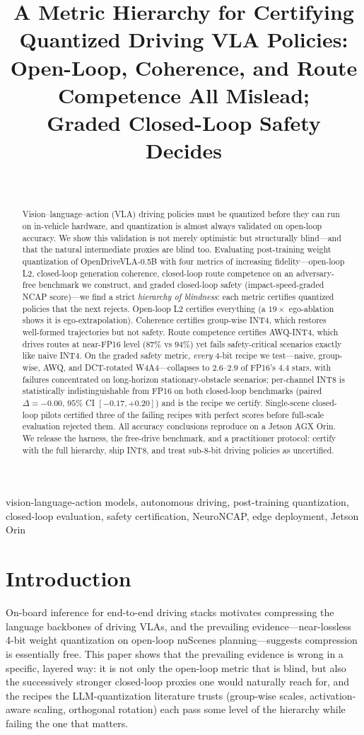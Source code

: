 \documentclass[conference]{IEEEtran}
\title{\textbf{A Metric Hierarchy for Certifying Quantized Driving VLA Policies:\\
Open-Loop, Coherence, and Route Competence All Mislead;\\
Graded Closed-Loop Safety Decides}}
\author{
\IEEEauthorblockN{Justin Williams$^{1}$, Kishor Datta Gupta$^{2}$, Roy George$^{3}$, and Mrinmoy Sarkar$^{4}$
}\\
\IEEEauthorblockA{Department of Cyber-Physical Systems, Clark Atlanta University, Atlanta, GA, USA\\
$^{1}$\textit{justin.williams1@students.cau.edu},
$^{2}$\textit{kgupta@cau.edu},
$^{3}$\textit{rgeorge@cau.edu}}
\IEEEauthorblockA{Siemens Corporation, Princeton, NJ, USA\\
$^{4}$\textit{mrinmoy.sarkar@siemens.com}}
}
\begin{document}
\maketitle

\begin{abstract}
Vision--language--action (VLA) driving policies must be quantized before they can run on
in-vehicle hardware, and quantization is almost always validated on open-loop accuracy. We
show this validation is not merely optimistic but structurally blind---and that the natural
intermediate proxies are blind too. Evaluating post-training weight quantization of
OpenDriveVLA-0.5B with four metrics of increasing fidelity---open-loop L2, closed-loop
generation coherence, closed-loop route competence on an adversary-free benchmark we
construct, and graded closed-loop safety (impact-speed-graded NCAP score)---we find a strict
\emph{hierarchy of blindness}: each metric certifies quantized policies that the next
rejects. Open-loop L2 certifies everything (a $19\times$ ego-ablation shows it is
ego-extrapolation). Coherence certifies group-wise INT4, which restores well-formed
trajectories but not safety. Route competence certifies AWQ-INT4, which drives routes at
near-FP16 level ($87\%$ vs $94\%$) yet fails safety-critical scenarios exactly like naive
INT4. On the graded safety metric, \emph{every} 4-bit recipe we test---naive, group-wise,
AWQ, and DCT-rotated W4A4---collapses to $2.6$--$2.9$ of FP16's $4.4$ stars, with failures
concentrated on long-horizon stationary-obstacle scenarios; per-channel INT8 is statistically
indistinguishable from FP16 on both closed-loop benchmarks (paired $\Delta=-0.00$,
$95\%$ CI $[-0.17,+0.20]$) and is the recipe we certify. Single-scene closed-loop pilots
certified three of the failing recipes with perfect scores before full-scale evaluation
rejected them. All accuracy conclusions reproduce on a Jetson AGX Orin. We release the
harness, the free-drive benchmark, and a practitioner protocol: certify with the full
hierarchy, ship INT8, and treat sub-8-bit driving policies as uncertified.
\end{abstract}
\begin{IEEEkeywords}
vision-language-action models, autonomous driving, post-training quantization, closed-loop
evaluation, safety certification, NeuroNCAP, edge deployment, Jetson Orin
\end{IEEEkeywords}

\section{Introduction}
On-board inference for end-to-end driving stacks motivates compressing the language backbones
of driving VLAs, and the prevailing evidence---near-lossless 4-bit weight quantization on
open-loop nuScenes planning---suggests compression is essentially free. This paper shows that
the prevailing evidence is wrong in a specific, layered way: it is not only the open-loop
metric that is blind, but also the successively stronger closed-loop proxies one would
naturally reach for, and the recipes the LLM-quantization literature trusts (group-wise
scales, activation-aware scaling, orthogonal rotation) each pass some level of the hierarchy
while failing the one that matters.
\end{document}
